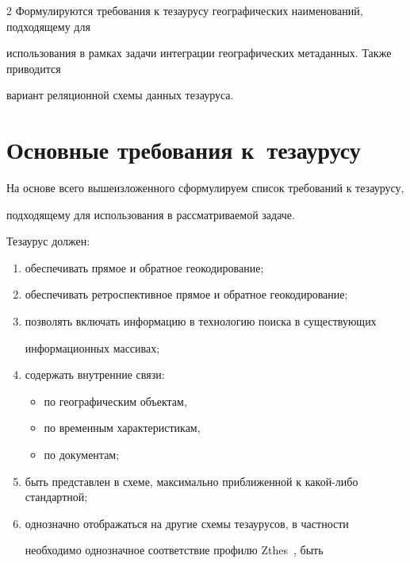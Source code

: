\begin{multicols}{2}
Формулируются требования к тезаурусу географических наименований, подходящему для 

использования в рамках задачи интеграции географических метаданных. Также приводится 

вариант реляционной схемы данных тезауруса.

  

  \section{Основные требования к~тезаурусу}

  

  На основе всего вышеизложенного сформулируем список требований к тезаурусу, 

подходящему для использования в рассматриваемой задаче.

  

  Тезаурус должен:

  \begin{enumerate}[(1)]

\item обеспечивать прямое и обратное геокодирование;

\item обеспечивать ретроспективное прямое и обратное геокодирование;

\item позволять включать информацию в технологию поиска в существующих 

информационных массивах;

\item содержать внутренние связи: 

\begin{itemize}

\item[(a)] по географическим объектам,

\item [(б)] по временным характеристикам,

\item[(в)] по документам;

\end{itemize}

\item быть представлен в схеме, максимально приближенной к какой-либо стандартной;

\item однозначно отображаться на другие схемы тезаурусов, в частности 

необходимо однозначное соответствие профилю {Zthes}~\cite{4-sk}, быть\linebreak 


\end{enumerate}
\end{multicols}

